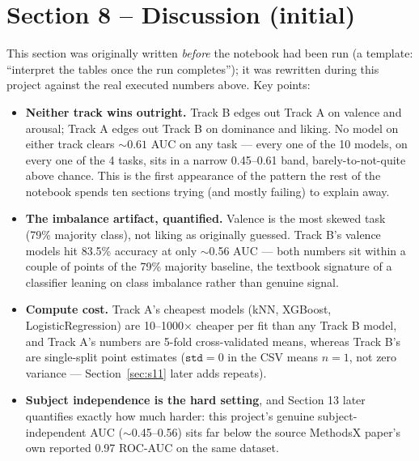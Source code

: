 \documentclass[11pt]{report}
\begin{document}
\section{Section 8 -- Discussion (initial)}
\label{sec:s8}
This section was originally written \emph{before} the notebook had been run
(a template: ``interpret the tables once the run completes''); it was
rewritten during this project against the real executed numbers above. Key
points:
\begin{itemize}
  \item \textbf{Neither track wins outright.} Track B edges out Track A on
        valence and arousal; Track A edges out Track B on dominance and
        liking. No model on either track clears $\sim0.61$ AUC on any task
        --- every one of the 10 models, on every one of the 4 tasks, sits in
        a narrow 0.45--0.61 band, barely-to-not-quite above chance. This is
        the first appearance of the pattern the rest of the notebook spends
        ten sections trying (and mostly failing) to explain away.
  \item \textbf{The imbalance artifact, quantified.} Valence is the most
        skewed task (79\% majority class), not liking as originally guessed.
        Track B's valence models hit 83.5\% accuracy at only $\sim$0.56 AUC
        --- both numbers sit within a couple of points of the 79\% majority
        baseline, the textbook signature of a classifier leaning on class
        imbalance rather than genuine signal.
  \item \textbf{Compute cost.} Track A's cheapest models (kNN, XGBoost,
        LogisticRegression) are 10--1000$\times$ cheaper per fit than any
        Track B model, and Track A's numbers are 5-fold cross-validated
        means, whereas Track B's are single-split point estimates
        ($\texttt{std}=0$ in the CSV means $n=1$, not zero variance ---
        Section~\ref{sec:s11} later adds repeats).
  \item \textbf{Subject independence is the hard setting}, and Section 13
        later quantifies exactly how much harder: this project's genuine
        subject-independent AUC ($\sim$0.45--0.56) sits far below the source
        MethodsX paper's own reported 0.97 ROC-AUC on the same dataset.
\end{itemize}
\end{document}
